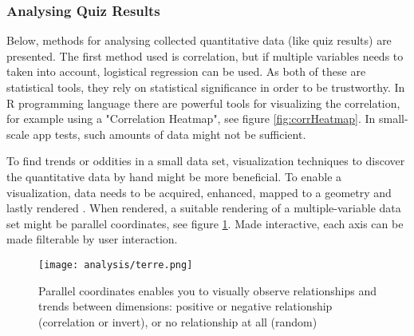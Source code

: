 \subsubsection{Analysing Quiz Results}
Below, methods for analysing collected quantitative data (like quiz results) are presented. The first method used is correlation, but if multiple variables needs to taken into account, logistical regression can be used. As both of these are statistical tools, they rely on statistical significance in order to be trustworthy. In R programming language there are powerful tools for visualizing the correlation, for example using a "Correlation Heatmap", see figure \ref{fig:corrHeatmap}. In small-scale app tests, such amounts of data might not be sufficient.

To find trends or oddities in a small data set, visualization techniques to discover the quantitative data by hand might be more beneficial. To enable a visualization, data needs to be acquired, enhanced, mapped to a geometry and lastly rendered \citep{timo-ropinski-liu}. When rendered, a suitable rendering of a multiple-variable data set might be parallel coordinates, see figure \ref{fig:uneTerre}. Made interactive, each axis can be made filterable by user interaction.

\begin{figure}[h]
    \centering
    \texttt{[image: analysis/terre.png]}
    \caption{Parallel coordinates enables you to visually observe relationships and trends between dimensions: positive or negative relationship (correlation or invert), or no relationship at all (random) \citep{une-terre}}
    \label{fig:uneTerre}
\end{figure}




